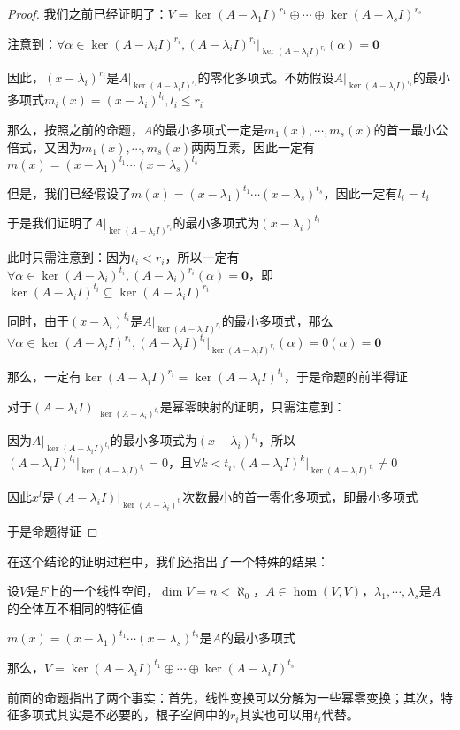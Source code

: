 \documentclass[12pt, a4paper, oneside, UTF8]{ctexbook}
\begin{document}
\begin{para}{0}
\begin{proof}
						我们之前已经证明了：$V = \ker(A-\lambda_1 I)^{r_1} \oplus \cdots \oplus \ker (A-\lambda_s I)^{r_s}$

						注意到：$\forall \alpha \in \ker(A-\lambda_i I)^{r_i},(A-\lambda_i I)^{r_i}|_{\ker (A-\lambda_i I)^{r_i}}(\alpha )=\mathbf{0}$

						因此，$(x-\lambda_i)^{r_i}$是$A|_{\ker (A-\lambda_i I)^{r_i}}$的零化多项式。不妨假设$A|_{\ker (A-\lambda_i I)^{r_i}}$的最小多项式$m_i(x)=(x-\lambda_i)^{l_i},l_i \leqslant r_i$

						那么，按照之前的命题，$A$的最小多项式一定是$m_1(x),\cdots,m_s(x)$的首一最小公倍式，又因为$m_1(x),\cdots,m_s(x)$两两互素，因此一定有$m(x)=(x-\lambda_1)^{l_1}\cdots(x-\lambda_s)^{l_s}$

						但是，我们已经假设了$m(x)=(x-\lambda_1)^{t_1}\cdots (x-\lambda_s)^{t_s}$，因此一定有$l_i=t_i$

						于是我们证明了$A|_{\ker (A-\lambda_i I)^{r_i}}$的最小多项式为$(x-\lambda_i)^{t_i}$

						此时只需注意到：因为$t_i < r_i$，所以一定有$\forall \alpha \in \ker (A-\lambda_i)^{t_i},(A-\lambda_i)^{r_i}(\alpha )=\mathbf{0}$，即$\ker (A-\lambda_i I)^{t_i} \subseteq \ker (A-\lambda_i I)^{r_i}$

						同时，由于$(x-\lambda_i)^{t_i}$是$A|_{\ker (A-\lambda_i I)^{r_i}}$的最小多项式，那么$\forall \alpha \in \ker(A-\lambda_i I)^{r_i},(A-\lambda_i I)^{t_i}|_{\ker (A-\lambda_i I)^{r_i}}(\alpha )=0(\alpha )=\mathbf{0}$

						那么，一定有$\ker (A-\lambda_i I)^{r_i} = \ker (A-\lambda_i I)^{t_i}$，于是命题的前半得证

						对于$(A-\lambda_i I)|_{\ker (A-\lambda_i)^{t_i}}$是幂零映射的证明，只需注意到：

						因为$A|_{\ker (A-\lambda_i I)^{t_i}}$的最小多项式为$(x-\lambda_i)^{t_i}$，所以$(A-\lambda_i I)^{t_i}|_{\ker (A-\lambda_i I)^{t_i}}=0$，且$\forall k < t_i,(A-\lambda_i I)^{k}|_{\ker (A-\lambda_i I)^{t_i}} \neq 0$

						因此$x^l$是$(A-\lambda_i I)|_{\ker (A-\lambda_i)^{t_i}}$次数最小的首一零化多项式，即最小多项式

						于是命题得证
					\end{proof}
					在这个结论的证明过程中，我们还指出了一个特殊的结果：
					\begin{corollary}{}{}
						设$V$是$F$上的一个线性空间，$\dim V = n < \aleph_0$，$A \in \hom(V,V)$，$\lambda_1,\cdots,\lambda_s$是$A$的全体互不相同的特征值
						
						$m(x)=(x-\lambda_1)^{t_1}\cdots (x-\lambda_s)^{t_s}$是$A$的最小多项式

						那么，$V = \ker(A-\lambda_i I)^{t_1} \oplus \cdots \oplus \ker (A-\lambda_i I)^{t_s}$
					\end{corollary}
					前面的命题指出了两个事实：首先，线性变换可以分解为一些幂零变换；其次，特征多项式其实是不必要的，根子空间中的$r_i$其实也可以用$t_i$代替。
			\end{para}
\end{document}
